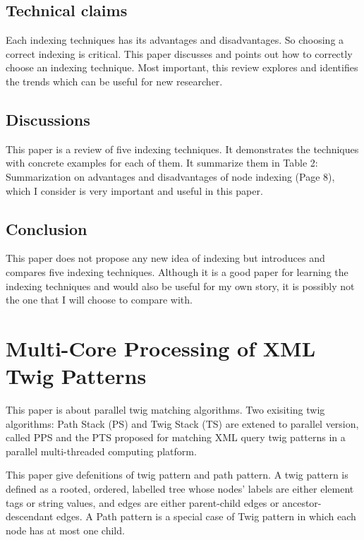 \documentclass{paper}
\begin{document}
\subsection{Technical claims}

Each indexing techniques has its advantages and disadvantages. So choosing a
correct indexing is critical. This paper discusses and points out how to
correctly choose an indexing technique. Most important, this review explores and
identifies the trends which can be useful for new researcher.


\subsection{Discussions}

This paper is a review of five indexing techniques. It demonstrates the
techniques with concrete examples for each of them. It summarize them in Table
2: Summarization on advantages and disadvantages of node indexing (Page 8),
which I consider  is very important and useful in this paper.


\subsection{Conclusion}

This paper does not propose any new idea of indexing but introduces and compares
five indexing techniques. Although it is a good paper for learning the indexing
techniques and would also be useful for my own story, it is possibly not the one
that I will choose to compare with.

\section{Multi-Core Processing of XML Twig Patterns}

This paper is about parallel twig matching algorithms. Two exisiting twig
algorithms: Path Stack (PS) and Twig Stack (TS) are extened to parallel version,
called PPS and the PTS proposed for matching XML query twig patterns in a
parallel multi-threaded computing platform.

This paper give defenitions of twig pattern and path pattern.  A twig pattern is
deﬁned as a rooted, ordered, labelled tree whose nodes’ labels are either
element tags or string values, and edges are either parent-child edges or
ancestor-descendant edges. A Path pattern is a special case of Twig pattern in
which each node has at most one child.
\end{document}
